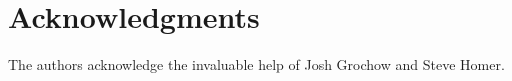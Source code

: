 \section{Acknowledgments}

The authors acknowledge the invaluable help of Josh Grochow and Steve Homer.
